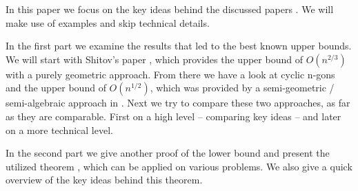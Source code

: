 In this paper we focus on the key ideas behind the discussed papers \cite{shitov2020sublinear,kwan2020extension}. We will make use of examples and skip technical details.

In the first part we examine the results that led to the best known upper bounds. 
We will start with Shitov's paper \cite{shitov2020sublinear}, which provides the upper bound of $O(n^{2/3})$ with a purely geometric approach.
From there we have a look at cyclic n-gons and the upper bound of $O(n^{1/2})$, which was provided by a semi-geometric / semi-algebraic approach in \cite{kwan2020extension}.
Next we try to compare these two approaches, as far as they are comparable. First on a high level -- comparing key ideas -- and later on a more technical level.

In the second part we give another proof of the lower bound and present the utilized theorem \cite[Theorem 1]{averkov2016maximum}, which can be applied on various problems. We also give a quick overview of the key ideas behind this theorem.
